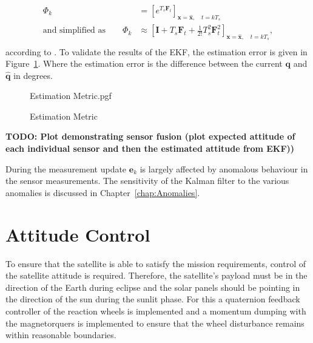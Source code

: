 \begin{equation}
\begin{aligned}
\Phi_k &= \left[e^{T_s\mathbf{F}_t}\right]_{\mathbf{x}=\mathbf{\hat{x}},\quad t = kT_s} \\
\text{and simplified as} \qquad \Phi_k &\approx \left[\mathbf{I} + T_s\mathbf{F}_t + \frac{1}{2!}T_s^2\mathbf{F}_t^2\right]_{\mathbf{x}=\mathbf{\hat{x}},\quad t = kT_s}, \\
\end{aligned}
\end{equation}
according to \cite{Steyn2004Notes}. To validate the results of the EKF, the estimation error is given in Figure~\ref{fig:Estimation Metric}. Where the estimation error is the difference between the current $\mathbf{q}$ and $\mathbf{\hat{q}}$ in degrees.

\begin{figure}[!htb]
\centering
\def\pgfwidth{10cm}
{Estimation Metric.pgf}

\caption{Estimation Metric}
\label{fig:Estimation Metric}
\end{figure}

\textbf{TODO: Plot demonstrating sensor fusion (plot expected attitude of each individual sensor and then the estimated attitude from EKF))}

During the measurement update $\mathbf{e}_k$ is largely affected by anomalous behaviour in the sensor measurements. The sensitivity of the Kalman filter to the various anomalies is discussed in Chapter~\ref{chap:Anomalies}.

\section{Attitude Control}
To ensure that the satellite is able to satisfy the mission requirements, control of the satellite attitude is required. Therefore, the satellite's payload must be in the direction of the Earth during eclipse and the solar panels should be pointing in the direction of the sun during the sunlit phase. For this a quaternion feedback controller of the reaction wheels is implemented and a momentum dumping with the magnetorquers is implemented to ensure that the wheel disturbance remains within reasonable boundaries.

